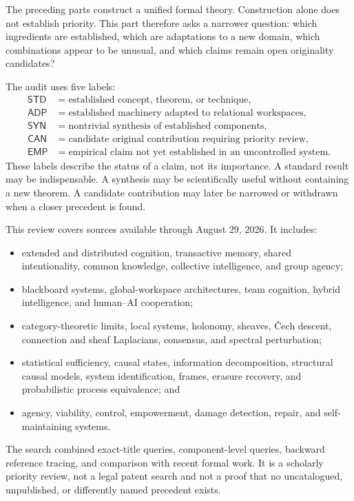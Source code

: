 


The preceding parts construct a unified formal theory. Construction alone does
not establish priority. This part therefore asks a narrower question:
which ingredients are established, which are adaptations to a new domain,
which combinations appear to be unusual, and which claims remain open originality candidates?

The audit uses five labels:
\[
\begin{array}{ll}
\mathsf{STD} & = \text{established concept, theorem, or technique},\\
\mathsf{ADP} & = \text{established machinery adapted to relational workspaces},\\
\mathsf{SYN} & = \text{nontrivial synthesis of established components},\\
\mathsf{CAN} & = \text{candidate original contribution requiring priority review},\\
\mathsf{EMP} & = \text{empirical claim not yet established in an uncontrolled system}.
\end{array}
\]
These labels describe the status of a claim, not its importance. A standard
result may be indispensable. A synthesis may be scientifically useful without
containing a new theorem. A candidate contribution may later be narrowed or
withdrawn when a closer precedent is found.


This review covers sources available through August 29, 2026. It includes:
\begin{itemize}
\item extended and distributed cognition, transactive memory, shared
 intentionality, common knowledge, collective intelligence, and group
 agency;
\item blackboard systems, global-workspace architectures, team cognition,
 hybrid intelligence, and human--AI cooperation;
\item category-theoretic limits, local systems, holonomy, sheaves, \v{C}ech
 descent, connection and sheaf Laplacians, consensus, and spectral
 perturbation;
\item statistical sufficiency, causal states, information decomposition,
 structural causal models, system identification, frames, erasure
 recovery, and probabilistic process equivalence; and
\item agency, viability, control, empowerment, damage detection, repair, and
 self-maintaining systems.
\end{itemize}
The search combined exact-title queries, component-level queries, backward
reference tracing, and comparison with recent formal work. It is a scholarly
priority review, not a legal patent search and not a proof that no uncatalogued,
unpublished, or differently named precedent exists.

